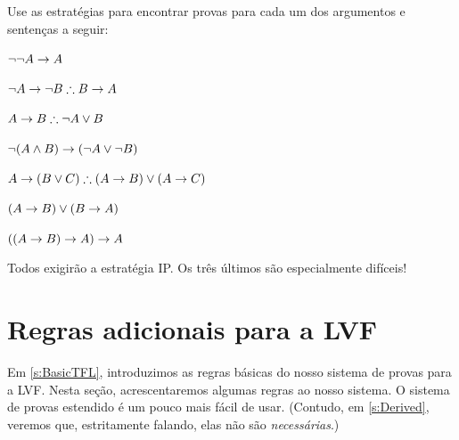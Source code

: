 \problempart
Use as estratégias para encontrar provas para cada um dos argumentos e sentenças a seguir:
\begin{compactlist}
\item $\neg\neg A \rightarrow A$
\item $\enot A \eif \enot B \therefore B \eif A$
\item $A \eif B \therefore \enot A \eor B$
\item $\neg(A \wedge B) \rightarrow (\neg A \vee \neg B)$
\item $A \eif (B \eor C) \therefore (A \eif B) \eor (A \eif C)$
\item $(A \rightarrow B) \lor (B \rightarrow A)$
\item $((A \rightarrow B) \rightarrow A) \rightarrow A$
\end{compactlist}
Todos exigirão a estratégia IP. Os três últimos são especialmente difíceis!

\chapter{Regras adicionais para a LVF}\label{s:Further}
Em \cref{s:BasicTFL}, introduzimos as regras básicas do nosso sistema de provas para a LVF. Nesta seção, acrescentaremos algumas regras ao nosso sistema. O sistema de provas estendido é um pouco mais fácil de usar. (Contudo, em \cref{s:Derived}, veremos que, estritamente falando, elas não são \emph{necessárias}.)


